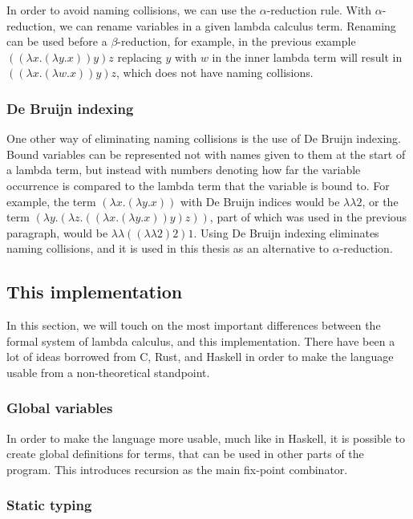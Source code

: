 \documentclass[12pt]{article}
\begin{document}
In order to avoid naming collisions, we can use the $\alpha$-reduction rule.
With $\alpha$-reduction, we can rename variables in a given lambda calculus
term. Renaming can be used before a $\beta$-reduction, for example, in the
previous example $((\lambda x. (\lambda y. x)) y) z$ replacing $y$ with $w$ in
the inner lambda term will result in $((\lambda x. (\lambda w. x)) y) z$, which
does not have naming collisions.

\subsubsection{De Bruijn indexing}

One other way of eliminating naming collisions is the use of De Bruijn indexing.
Bound variables can be represented not with names given to them at the start of
a lambda term, but instead with numbers denoting how far the variable occurrence
is compared to the lambda term that the variable is bound to. For example, the
term $(\lambda x. (\lambda y. x))$ with De Bruijn indices would be $\lambda
\lambda 2$, or the term $(\lambda y. (\lambda z. ((\lambda x. (\lambda y. x)) y)
z))$, part of which was used in the previous paragraph, would be $\lambda
\lambda ((\lambda \lambda 2) 2) 1$. Using De Bruijn indexing eliminates naming
collisions, and it is used in this thesis as an alternative to
$\alpha$-reduction.

\subsection{This implementation}

In this section, we will touch on the most important differences between the
formal system of lambda calculus, and this implementation. There have been a lot
of ideas borrowed from C, Rust, and Haskell in order to make the language usable
from a non-theoretical standpoint.

\subsubsection{Global variables}

In order to make the language more usable, much like in Haskell, it is possible
to create global definitions for terms, that can be used in other parts of the
program. This introduces recursion as the main fix-point combinator.

\subsubsection{Static typing}
\end{document}
